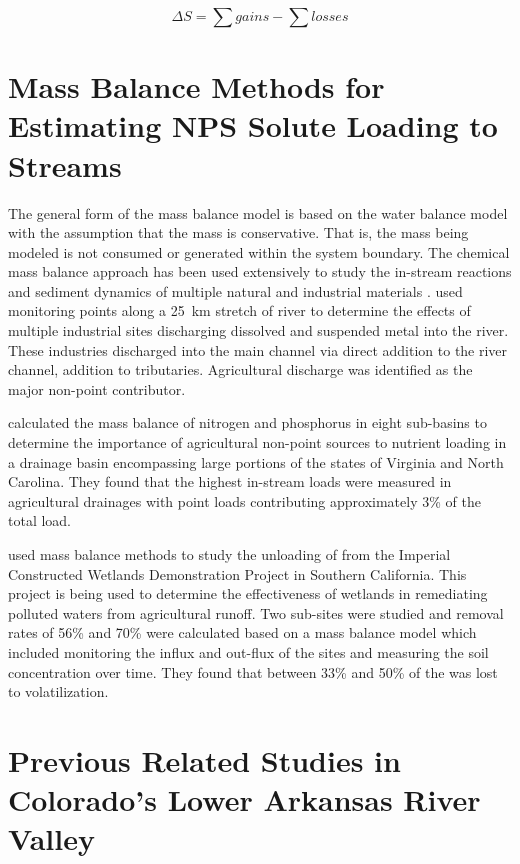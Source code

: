 \begin{linenumbers}[1]
\begin{equation}
	\label{eq:genWater}
	\Delta S = \sum gains - \sum losses
\end{equation}

\section{Mass Balance Methods for Estimating NPS Solute Loading to Streams}
\label{sec:mass balance methods}
The general form of the mass balance model is based on the water balance model with the assumption that the mass is conservative.  That is, the mass being modeled is not consumed or generated within the system boundary.  The chemical mass balance approach has been used extensively to study the in-stream reactions and sediment dynamics of multiple natural and industrial materials \parencite{Plummer1980,Christophersen1981,Elder1985,Jain1996,Latimer1988,Yuretich1988}. \textcite{Jain1996} used monitoring points along a \SI{25}{\kilo\m} stretch of river to determine the effects of multiple industrial sites discharging dissolved and suspended metal into the river.  These industries discharged into the main channel via direct addition to the river channel, addition to tributaries.  Agricultural discharge was identified as the major non-point contributor.

\textcite{mcmahon1997} calculated the mass balance of nitrogen and phosphorus in eight sub-basins to determine the importance of agricultural non-point sources to nutrient loading in a drainage basin encompassing large portions of the states of Virginia and North Carolina.  They found that the highest in-stream loads were measured in agricultural drainages with point loads contributing approximately 3\% of the total load. 

\textcite{Gersberg2006} used mass balance methods to study the unloading of \Se from the Imperial Constructed Wetlands Demonstration Project in Southern California.  This project is being used to determine the effectiveness of wetlands in remediating \Se polluted waters from agricultural runoff.  Two sub-sites were studied and removal rates of 56\% and 70\% were calculated based on a mass balance model which included monitoring the influx and out-flux of the sites and measuring the soil concentration over time.  They found that between 33\% and 50\% of the \Se was lost to volatilization. 


\section{Previous Related Studies in Colorado's Lower Arkansas River Valley}
\label{sec:previous studies}


\end{linenumbers}
